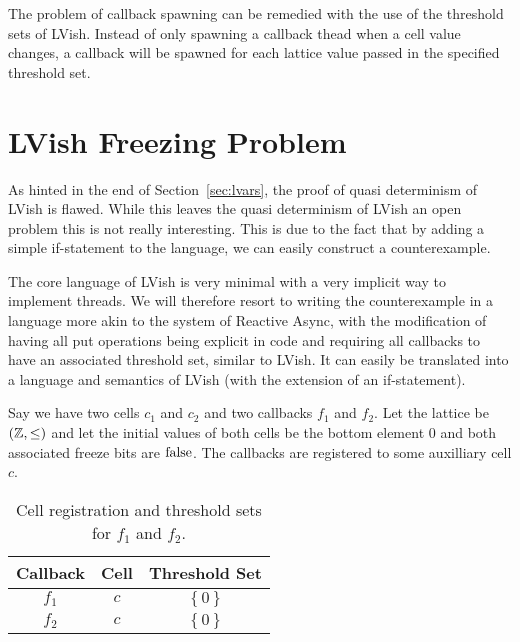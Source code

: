 The problem of callback spawning can be remedied with the use of the threshold
sets of LVish. Instead of only spawning a callback thead when a cell value
changes, a callback will be spawned for each lattice value passed in the
specified threshold set.



\section{LVish Freezing Problem}%
\label{sec:a_problem_of_lvish}

As hinted in the end of Section~\ref{sec:lvars}, the proof of quasi determinism
of LVish is flawed. While this leaves the quasi determinism of LVish an open
problem this is not really interesting. This is due to the fact that by adding a
simple if-statement to the language, we can easily construct a counterexample.

The core language of LVish is very minimal with a very implicit way to implement
threads. We will therefore resort to writing the counterexample in a language
more akin to the system of Reactive Async, with the modification of having all
put operations being explicit in code and requiring all callbacks to have an
associated threshold set, similar to LVish. It can easily be translated into a
language and semantics of LVish (with the extension of an if-statement).

Say we have two cells $c_1$ and $c_2$ and two callbacks $f_1$ and $f_2$. Let the
lattice be $(\mathbb{Z}, \leq)$ and let the initial values of both cells be the
bottom element $0$ and both associated freeze bits are $\mathrm{false}$. The
callbacks are registered to some auxilliary cell $c$. 

\begin{table}
  \centering
  \begin{tabular}{c|c|c}
    Callback & Cell & Threshold Set \\
    \hline
    $f_1$ & $c$ & $\left\{ 0 \right\}$ \\
    $f_2$ & $c$ & $\left\{ 0 \right\}$ \\
  \end{tabular}
  \caption{Cell registration and threshold sets for $f_1$ and $f_2$.}
  \label{tab:cellreg}
\end{table}

